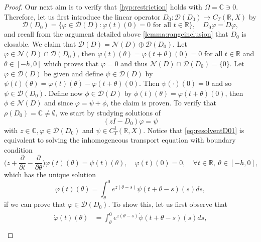 \documentclass[english]{myarticle}
\begin{document}
\begin{sloppypar}
\begin{proof}
Our next aim is to verify that \ref{hyp:restriction} holds with $\Omega = \mathbb{C} \ni 0$. Therefore, let us first introduce the linear operator $D_0 : \mathcal{D}(D_0) \to C_T(\mathbb{R},X)$ by
\begin{equation*}
    \mathcal{D}(D_0) = \{ \varphi \in \mathcal{D}(D) : \varphi(t)(0) = 0 \mbox{ for all } t \in \mathbb{R} \}, \quad  D_0\varphi = D\varphi,
\end{equation*}
and recall from the argument detailed above \cref{lemma:rangeinclusion} that $D_0$ is closable. We claim that $\mathcal{D}(D) = \mathcal{N} (D) \oplus \mathcal{D}(D_0)$. Let $\varphi \in \mathcal{N} (D) \cap \mathcal{D}(D_0)$, then $\varphi(t)(\theta) = \varphi(t+\theta)(0) = 0$ for all $t \in \mathbb{R}$ and $\theta \in [-h,0]$ which proves that $\varphi = 0$ and thus $\mathcal{N}(D) \cap \mathcal{D}(D_0) = \{0 \}$. Let $\varphi \in \mathcal{D}(D)$ be given and define $\psi \in \mathcal{D}(D)$ by $\psi(t)(\theta) = \varphi(t)(\theta) - \varphi(t+\theta)(0)$. Then $\psi(\cdot)(0) = 0$ and so $\psi \in \mathcal{D}(D_0)$. Define now $\phi \in \mathcal{D}(D)$ by $\phi(t)(\theta) = \varphi(t+\theta)(0)$, then $\phi \in \mathcal{N} (D)$ and since $\varphi = \psi + \phi$, the claim is proven. To verify that $\rho(D_0) = \mathbb{C} \neq \emptyset$, we start by studying solutions of
\begin{equation} \label{eq:resolventD01}
    (zI -D_0)\varphi = \psi
\end{equation}
with $z \in \mathbb{C}, \varphi \in \mathcal{D}(D_0)$ and $\psi \in C_T^1(\mathbb{R},X)$. Notice that \eqref{eq:resolventD01} is equivalent to solving the inhomogeneous transport equation with boundary condition
\begin{equation*}
    \bigg( z + \frac{\partial}{\partial t} - \frac{\partial}{\partial \theta}  \bigg) \varphi(t)(\theta) = \psi(t)(\theta), \quad \varphi(t)(0) = 0, \quad \forall t \in \mathbb{R}, \ \theta \in [-h,0],
\end{equation*}
which has the unique solution 
\begin{equation} \label{eq:resolventD02}
    \varphi(t)(\theta) = \int_\theta^0 e^{z(\theta - s)} \psi(t+\theta -s)(s) ds,
\end{equation}
if we can prove that $\varphi \in \mathcal{D}(D_0)$. To show this, let us first observe that
\begin{align}
\begin{split} \label{eq:derivativesresolventDDE}
    \dot{\varphi}(t)(\theta) &= \int_\theta^0 e^{z(\theta - s)} \dot{\psi}(t+\theta -s)(s) ds, \\

\end{split}
\end{align}
\end{proof}
\end{sloppypar}
\end{document}
